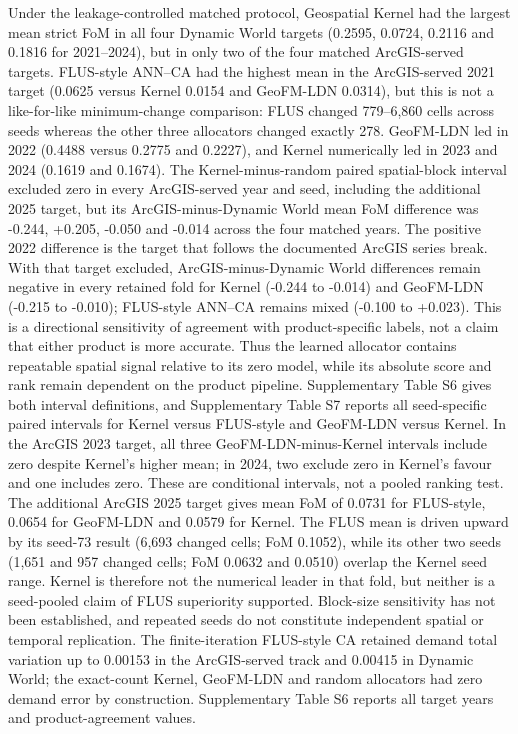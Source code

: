 Under the leakage-controlled matched protocol, Geospatial Kernel had the
largest mean strict FoM in all four Dynamic World targets (0.2595,
0.0724, 0.2116 and 0.1816 for 2021--2024), but in only two of the four
matched ArcGIS-served targets. FLUS-style ANN--CA had the highest mean
in the ArcGIS-served 2021 target (0.0625 versus Kernel 0.0154 and
GeoFM-LDN 0.0314), but this is not a like-for-like minimum-change
comparison: FLUS changed 779--6,860 cells across seeds whereas the other
three allocators changed exactly 278. GeoFM-LDN led in 2022 (0.4488
versus 0.2775 and 0.2227), and Kernel numerically led in 2023 and 2024
(0.1619 and 0.1674). The Kernel-minus-random paired spatial-block
interval excluded zero in every ArcGIS-served year and seed, including
the additional 2025 target, but its ArcGIS-minus-Dynamic World mean FoM
difference was -0.244, +0.205, -0.050 and -0.014 across the four matched
years. The positive 2022 difference is the target that follows the
documented ArcGIS series break. With that target excluded,
ArcGIS-minus-Dynamic World differences remain negative in every retained
fold for Kernel (-0.244 to -0.014) and GeoFM-LDN (-0.215 to -0.010);
FLUS-style ANN--CA remains mixed (-0.100 to +0.023). This is a
directional sensitivity of agreement with product-specific labels, not a
claim that either product is more accurate. Thus the learned allocator
contains repeatable spatial signal relative to its zero model, while its
absolute score and rank remain dependent on the product pipeline.
Supplementary Table S6 gives both interval definitions, and
Supplementary Table S7 reports all seed-specific paired intervals for
Kernel versus FLUS-style and GeoFM-LDN versus Kernel. In the ArcGIS 2023
target, all three GeoFM-LDN-minus-Kernel intervals include zero despite
Kernel's higher mean; in 2024, two exclude zero in Kernel's favour and
one includes zero. These are conditional intervals, not a pooled ranking
test. The additional ArcGIS 2025 target gives mean FoM of 0.0731 for
FLUS-style, 0.0654 for GeoFM-LDN and 0.0579 for Kernel. The FLUS mean is
driven upward by its seed-73 result (6,693 changed cells; FoM 0.1052),
while its other two seeds (1,651 and 957 changed cells; FoM 0.0632 and
0.0510) overlap the Kernel seed range. Kernel is therefore not the
numerical leader in that fold, but neither is a seed-pooled claim of
FLUS superiority supported. Block-size sensitivity has not been
established, and repeated seeds do not constitute independent spatial or
temporal replication. The finite-iteration FLUS-style CA retained demand
total variation up to 0.00153 in the ArcGIS-served track and 0.00415 in
Dynamic World; the exact-count Kernel, GeoFM-LDN and random allocators
had zero demand error by construction. Supplementary Table S6 reports
all target years and product-agreement values.

